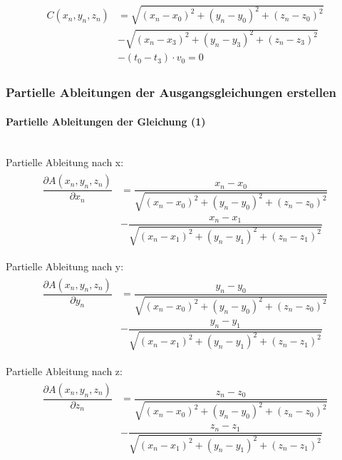 \begin{align}
\begin{split}
C(x_{n},y_{n},z_{n})  &=  \sqrt{(x_{n}- x_{0})^{2} + (y_{n} - y_{0})^{2} + (z_{n} - z_{0})^{2}} \\& - \sqrt{(x_{n}- x_{3})^{2} + (y_{n} - y_{3})^{2} + (z_{n} - z_{3})^{2}} \\ & - (t_{0} - t_{3}) \cdot v_{0} = 0\label{eq:Gleichung3}
\end{split}
\end{align}
\subsubsection{Partielle Ableitungen der Ausgangsgleichungen erstellen}
\paragraph{Partielle Ableitungen der Gleichung (1)}\ \\

Partielle Ableitung nach x:
\begin{align}
\begin{split}
\dfrac{\partial A(x_{n},y_{n},z_{n})}{\partial x_{n}} &= \dfrac{x_{n}-x_{0}}{\sqrt{(x_{n}-x_{0})^{2}+ (y_{n}-y_{0})^{2}+(z_{n}-z_{0})^{2}}} \\ & - \dfrac{x_{n}-x_{1}}{\sqrt{(x_{n}-x_{1})^{2}+ (y_{n}-y_{1})^{2}+(z_{n}-z_{1})^{2}}}
\end{split}
\end{align}

Partielle Ableitung nach y:
\begin{align}
\begin{split}
\dfrac{\partial A(x_{n},y_{n},z_{n})}{\partial y_{n}} &= \dfrac{y_{n}-y_{0}}{\sqrt{(x_{n}-x_{0})^{2}+ (y_{n}-y_{0})^{2}+(z_{n}-z_{0})^{2}}} \\ & - \dfrac{y_{n}-y_{1}}{\sqrt{(x_{n}-x_{1})^{2}+ (y_{n}-y_{1})^{2}+(z_{n}-z_{1})^{2}}}
\end{split}
\end{align}

Partielle Ableitung nach z:
\begin{align}
\begin{split}
\dfrac{\partial A(x_{n},y_{n},z_{n})}{\partial z_{n}} &= \dfrac{z_{n}-z_{0}}{\sqrt{(x_{n}-x_{0})^{2}+ (y_{n}-y_{0})^{2}+(z_{n}-z_{0})^{2}}} \\ & - \dfrac{z_{n}-z_{1}}{\sqrt{(x_{n}-x_{1})^{2}+ (y_{n}-y_{1})^{2}+(z_{n}-z_{1})^{2}}}
\end{split}
\end{align}
